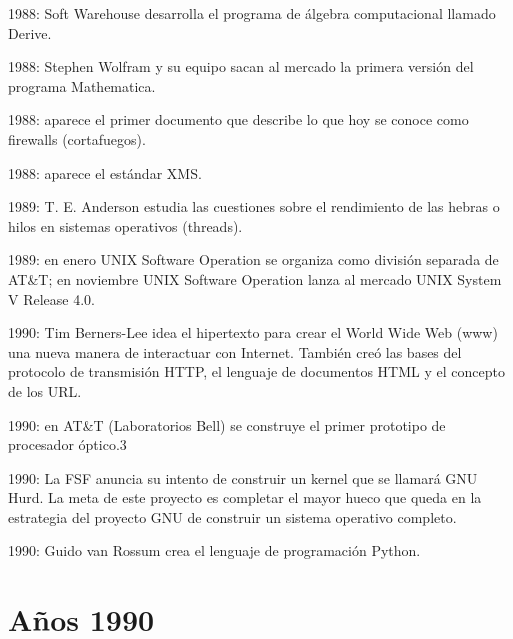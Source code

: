 \documentclass{article}
\begin{document}
{    \item 1988: Soft Warehouse desarrolla el programa de álgebra computacional llamado Derive.
    \item 1988: Stephen Wolfram y su equipo sacan al mercado la primera versión del programa Mathematica.
    \item 1988: aparece el primer documento que describe lo que hoy se conoce como firewalls (cortafuegos).
    \item 1988: aparece el estándar XMS.
    \item 1989: T. E. Anderson estudia las cuestiones sobre el rendimiento de las hebras o hilos en sistemas operativos (threads).
    \item 1989: en enero UNIX Software Operation se organiza como división separada de AT&T; en noviembre UNIX Software Operation lanza al mercado UNIX System V Release 4.0.
    \item 1990: Tim Berners-Lee idea el hipertexto para crear el World Wide Web (www) una nueva manera de interactuar con Internet. También creó las bases del protocolo de transmisión HTTP, el lenguaje de documentos HTML y el concepto de los URL.
    \item 1990: en AT&T (Laboratorios Bell) se construye el primer prototipo de procesador óptico.3​
    \item 1990: La FSF anuncia su intento de construir un kernel que se llamará GNU Hurd. La meta de este proyecto es completar el mayor hueco que queda en la estrategia del proyecto GNU de construir un sistema operativo completo.
    \item 1990: Guido van Rossum crea el lenguaje de programación Python.

}

\section{Años 1990}
\end{document}

